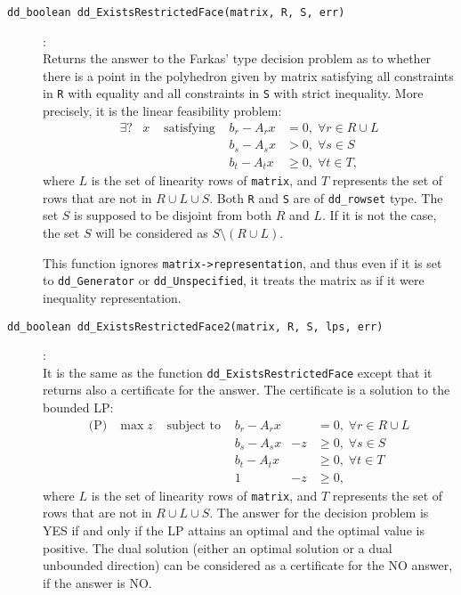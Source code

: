 \documentclass[11pt]{article}
\newcommand {\0} {{\bf 0}}
\begin{document}
\begin{description}
\item[{\tt dd\_boolean dd\_ExistsRestrictedFace(matrix, R, S, err)}]:\\
Returns the answer to the Farkas' type decision problem as to whether there is a point
in the polyhedron given by matrix satisfying all constraints in {\tt R} with
equality and all constraints in {\tt S} with strict inequality.  More precisely,
it is the linear feasibility problem:
\[
\begin{array}{llllll}
\exists\mbox{?} &x  &\mbox{ satisfying } & b_r - A_r x  &= 0, \; \forall r \in R\cup L \\
                &   &                    & b_s - A_s x  &> 0, \; \forall s \in S \\
                &   &                    & b_t - A_t x  &\ge 0, \; \forall t \in T,
\end{array}
\]
where $L$ is the set of linearity rows of {\tt matrix}, and $T$ represents
the set of rows that are not in $R\cup L \cup S$.
Both {\tt R} and {\tt S} are of {\tt dd\_rowset} type.  The set $S$ is
supposed to be disjoint from both $R$ and $L$.
If it is not the case, the set $S$ will be considered as $S \setminus (R \cup L)$.

This function ignores {\tt matrix->representation}, and thus even if it is
set to {\tt dd\_Generator} or {\tt dd\_Unspecified}, it treats the matrix
as if it were inequality representation.

\item[{\tt dd\_boolean dd\_ExistsRestrictedFace2(matrix, R, S, lps, err)}]:\\
It is the same as the function {\tt dd\_ExistsRestrictedFace} except that
it returns also a certificate for the answer.  The certificate is a solution
to the bounded LP:
\[
\begin{array}{lllllll}
\mbox{(P)} &\max  z  &\mbox{ subject to } & b_r - A_r x  &   & = 0, \; \forall r \in R\cup L \\
           &         &                    & b_s - A_s x  &-z &\ge 0, \;  \forall s \in S \\
          &         &                    & b_t - A_t x   &   &\ge 0, \; \forall t \in T \\
         &         &                    & 1              & -z&\ge 0,
\end{array}
\]
where $L$ is the set of linearity rows of {\tt matrix}, and $T$ represents
the set of rows that are not in $R\cup L \cup S$.
The answer for the decision problem is YES if and only if the LP attains
an optimal and the optimal value is positive.  The dual solution (either
an optimal solution or a dual unbounded direction) can be considered
as a certificate for the NO answer, if the answer is NO.


\end{description}
\end{document}
